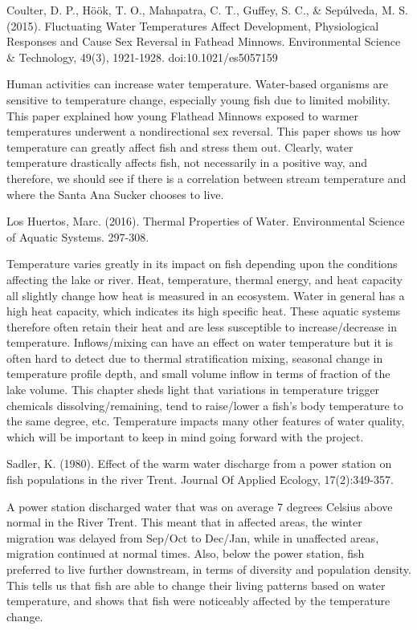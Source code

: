 \documentclass{article}
\begin{document}
Coulter, D. P., Höök, T. O., Mahapatra, C. T., Guffey, S. C., \& Sepúlveda, M. S. (2015). Fluctuating Water Temperatures Affect Development, Physiological Responses and Cause Sex Reversal in Fathead Minnows. Environmental Science \& Technology, 49(3), 1921-1928. doi:10.1021/es5057159

Human activities can increase water temperature. Water-based organisms are sensitive to temperature change, especially young fish due to limited mobility. This paper explained how young Flathead Minnows exposed to warmer temperatures underwent a nondirectional sex reversal. This paper shows us how temperature can greatly affect fish and stress them out. Clearly, water temperature drastically affects fish, not necessarily in a positive way, and therefore, we should see if there is a correlation between stream temperature and where the Santa Ana Sucker chooses to live.

Los Huertos, Marc. (2016). Thermal Properties of Water. Environmental Science of Aquatic Systems. 297-308.

Temperature varies greatly in its impact on fish depending upon the conditions affecting the lake or river. Heat, temperature, thermal energy, and heat capacity all slightly change how heat is measured in an ecosystem. Water in general has a high heat capacity, which indicates its high specific heat. These aquatic systems therefore often retain their heat and are less susceptible to increase/decrease in temperature. Inflows/mixing can have an effect on water temperature but it is often hard to detect due to thermal stratification mixing, seasonal change in temperature profile depth, and small volume inflow in terms of fraction of the lake volume. This chapter sheds light that variations in temperature trigger chemicals dissolving/remaining, tend to raise/lower a fish’s body temperature to the same degree, etc. Temperature impacts many other features of water quality, which will be important to keep in mind going forward with the project.

Sadler, K. (1980). Effect of the warm water discharge from a power station on fish populations in the river Trent. Journal Of Applied Ecology, 17(2):349-357.

A power station discharged water that was on average 7 degrees Celsius above normal in the River Trent. This meant that in affected areas, the winter migration was delayed from Sep/Oct to Dec/Jan, while in unaffected areas, migration continued at normal times. Also, below the power station, fish preferred to live further downstream, in terms of diversity and population density. This tells us that fish are able to change their living patterns based on water temperature, and shows that fish were noticeably affected by the temperature change. 
\end{document}
